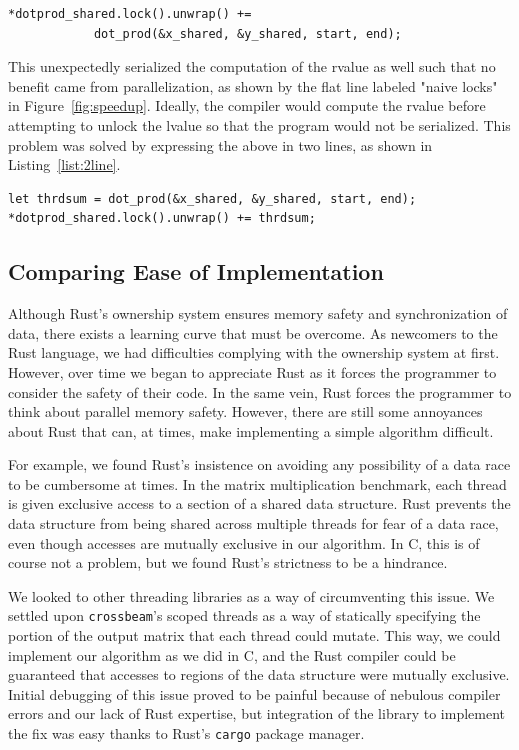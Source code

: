 \begin{lstlisting}[caption={Rvalue used in serialized add},label=list:rvalue]
*dotprod_shared.lock().unwrap() +=
			dot_prod(&x_shared, &y_shared, start, end);
\end{lstlisting}

This unexpectedly serialized the computation of the rvalue as well such that no benefit came from parallelization, as shown by the flat line labeled "naive locks" in Figure~\ref{fig:speedup}. Ideally, the compiler would compute the rvalue before attempting to unlock the lvalue so that the program would not be serialized. This problem was solved by expressing the above in two lines, as shown in Listing~\ref{list:2line}.
\begin{lstlisting}[caption={Rvalue used in serialized add},label=list:2line]
let thrdsum = dot_prod(&x_shared, &y_shared, start, end);
*dotprod_shared.lock().unwrap() += thrdsum;
\end{lstlisting}

\subsection{Comparing Ease of Implementation}
Although Rust's ownership system ensures memory safety and synchronization of data, there exists a learning curve that must be overcome. As newcomers to the Rust language, we had difficulties complying with the ownership system at first. However, over time we began to appreciate Rust as it forces the programmer to consider the safety of their code. In the same vein, Rust forces the programmer to think about parallel memory safety. However, there are still some annoyances about Rust that can, at times, make implementing a simple algorithm difficult.

For example, we found Rust's insistence on avoiding any possibility of a data race to be cumbersome at times. In the matrix multiplication benchmark, each thread is given exclusive access to a section of a shared data structure. Rust prevents the data structure from being shared across multiple threads for fear of a data race, even though accesses are mutually exclusive in our algorithm. In C, this is of course not a problem, but we found Rust's strictness to be a hindrance.

We looked to other threading libraries as a way of circumventing this issue. We settled upon \texttt{crossbeam}'s scoped threads as a way of statically specifying the portion of the output matrix that each thread could mutate. This way, we could implement our algorithm as we did in C, and the Rust compiler could be guaranteed that accesses to regions of the data structure were mutually exclusive. Initial debugging of this issue proved to be painful because of nebulous compiler errors and our lack of Rust expertise, but integration of the library to implement the fix was easy thanks to Rust's \texttt{cargo} package manager.

